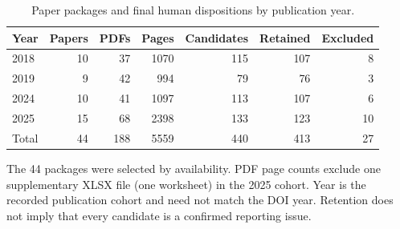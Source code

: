 \begin{table}[tbp]
\centering\small
\caption{Paper packages and final human dispositions by publication year.}
\label{tab:cohort}
\begin{tabular}{lrrrrrr}
\toprule
Year & Papers & PDFs & Pages & Candidates & Retained & Excluded \\
\midrule
2018 & 10 & 37 & 1070 & 115 & 107 & 8 \\
2019 & 9 & 42 & 994 & 79 & 76 & 3 \\
2024 & 10 & 41 & 1097 & 113 & 107 & 6 \\
2025 & 15 & 68 & 2398 & 133 & 123 & 10 \\
\midrule
Total & 44 & 188 & 5559 & 440 & 413 & 27 \\
\bottomrule
\end{tabular}
\par\vspace{4pt}\begin{minipage}{0.97\linewidth}\footnotesize The 44 packages were selected by availability. PDF page counts exclude one supplementary XLSX file (one worksheet) in the 2025 cohort. Year is the recorded publication cohort and need not match the DOI year. Retention does not imply that every candidate is a confirmed reporting issue.\end{minipage}
\end{table}
